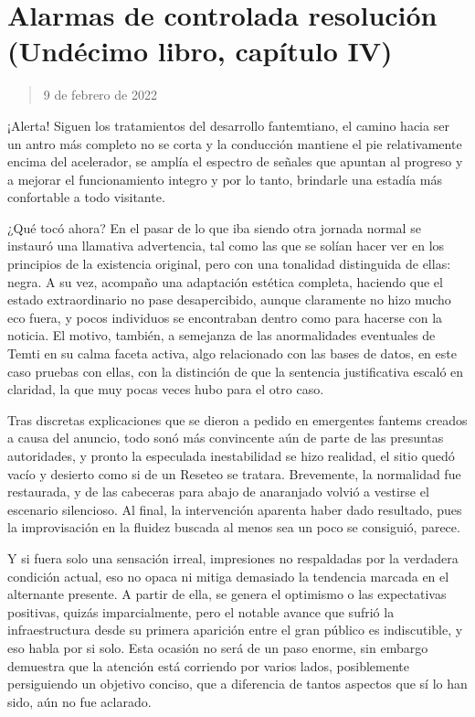 \documentclass[
]{book}
\begin{document}
\hypertarget{alarmas-de-controlada-resoluciuxf3n-unduxe9cimo-libro-capuxedtulo-iv}{%
\section{Alarmas de controlada resolución (Undécimo libro, capítulo IV)}\label{alarmas-de-controlada-resoluciuxf3n-unduxe9cimo-libro-capuxedtulo-iv}}

\begin{quote}
9 de febrero de 2022
\end{quote}

¡Alerta! Siguen los tratamientos del desarrollo fantemtiano, el camino hacia ser un antro más completo no se corta y la conducción mantiene el pie relativamente encima del acelerador, se amplía el espectro de señales que apuntan al progreso y a mejorar el funcionamiento integro y por lo tanto, brindarle una estadía más confortable a todo visitante.

¿Qué tocó ahora? En el pasar de lo que iba siendo otra jornada normal se instauró una llamativa advertencia, tal como las que se solían hacer ver en los principios de la existencia original, pero con una tonalidad distinguida de ellas: negra. A su vez, acompaño una adaptación estética completa, haciendo que el estado extraordinario no pase desapercibido, aunque claramente no hizo mucho eco fuera, y pocos individuos se encontraban dentro como para hacerse con la noticia. El motivo, también, a semejanza de las anormalidades eventuales de Temti en su calma faceta activa, algo relacionado con las bases de datos, en este caso pruebas con ellas, con la distinción de que la sentencia justificativa escaló en claridad, la que muy pocas veces hubo para el otro caso.

Tras discretas explicaciones que se dieron a pedido en emergentes fantems creados a causa del anuncio, todo sonó más convincente aún de parte de las presuntas autoridades, y pronto la especulada inestabilidad se hizo realidad, el sitio quedó vacío y desierto como si de un Reseteo se tratara. Brevemente, la normalidad fue restaurada, y de las cabeceras para abajo de anaranjado volvió a vestirse el escenario silencioso. Al final, la intervención aparenta haber dado resultado, pues la improvisación en la fluidez buscada al menos sea un poco se consiguió, parece.

Y si fuera solo una sensación irreal, impresiones no respaldadas por la verdadera condición actual, eso no opaca ni mitiga demasiado la tendencia marcada en el alternante presente. A partir de ella, se genera el optimismo o las expectativas positivas, quizás imparcialmente, pero el notable avance que sufrió la infraestructura desde su primera aparición entre el gran público es indiscutible, y eso habla por si solo. Esta ocasión no será de un paso enorme, sin embargo demuestra que la atención está corriendo por varios lados, posiblemente persiguiendo un objetivo conciso, que a diferencia de tantos aspectos que sí lo han sido, aún no fue aclarado.
\end{document}
